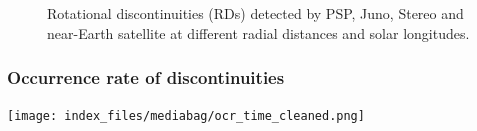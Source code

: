 \documentclass[
  letterpaper,
  DIV=11,
  numbers=noendperiod,
  oneside]{scrartcl}
\begin{document}
\begin{figure}

\begin{minipage}[t]{0.50\linewidth}


\end{minipage}%
%
\begin{minipage}[t]{0.50\linewidth}


\end{minipage}%
\newline
\begin{minipage}[t]{0.50\linewidth}


\end{minipage}%
%
\begin{minipage}[t]{0.50\linewidth}


\end{minipage}%

\caption{\label{fig-ids}Rotational discontinuities (RDs) detected by
PSP, Juno, Stereo and near-Earth satellite at different radial distances
and solar longitudes.}

\end{figure}%

\subsubsection{Occurrence rate of
discontinuities}\label{occurrence-rate-of-discontinuities}

\texttt{[image: index\_files/mediabag/ocr\_time\_cleaned.png]}
\end{document}
